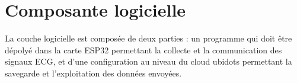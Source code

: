 \section{Composante logicielle}
La couche logicielle est composée de deux parties : un programme qui doit être dépolyé dans la carte ESP32 permettant la collecte et la communication des signaux ECG, et d'une configuration au niveau du cloud ubidots permettant la savegarde et l'exploitation des données envoyées.


